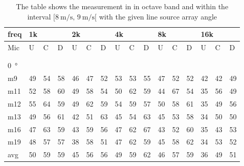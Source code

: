\begin{table}[H]
\centering
\caption{The table shows the measurement in in octave band and within the interval $[\SI{8}{\meter\per\second},\, \SI{9}{\meter\per\second}[ $ with the given line source array angle}
\begin{tabular}{l|l|l|l|l|l|l|l|l|l|l|l|l|lll}
freq & \multicolumn{3}{l|}{1k} & \multicolumn{3}{l|}{2k} & \multicolumn{3}{l|}{4k} & \multicolumn{3}{l|}{8k} & \multicolumn{3}{l}{16k}                                \\ \hline
Mic  & U      & C      & D     & U      & C      & D     & U      & C      & D     & U      & C      & D     & \multicolumn{1}{l|}{U}  & \multicolumn{1}{l|}{C}  & D  \\ \hline
 & \multicolumn{3}{l|}{} & \multicolumn{3}{l|}{} & \multicolumn{3}{l|}{} & \multicolumn{3}{l|}{} & \multicolumn{3}{l}{}                                \\ 
 \multicolumn{16}{l}{ } \\   
\SI{0}{\degree}   & \multicolumn{3}{l|}{} & \multicolumn{3}{l|}{} & \multicolumn{3}{l|}{} & \multicolumn{3}{l|}{} & \multicolumn{3}{l}{}   \\  \hline
m9   & 49     & 54     & 58    & 46     & 47     & 52    & 53     & 53     & 55    & 47     & 52     & 52    & \multicolumn{1}{l|}{42} & \multicolumn{1}{l|}{42} & 49 \\
m11  & 52     & 58     & 60    & 49     & 58     & 54    & 50     & 62     & 59    & 44     & 67     & 54    & \multicolumn{1}{l|}{35} & \multicolumn{1}{l|}{56} & 49 \\
m12  & 55     & 64     & 59    & 49     & 62     & 59    & 54     & 59     & 57    & 50     & 58     & 61    & \multicolumn{1}{l|}{35} & \multicolumn{1}{l|}{49} & 56 \\
m13  & 49     & 56     & 61    & 42     & 51     & 63    & 45     & 54     & 63    & 45     & 53     & 58    & \multicolumn{1}{l|}{34} & \multicolumn{1}{l|}{50} & 50 \\
m16  & 47     & 63     & 59    & 43     & 59     & 56    & 47     & 62     & 67    & 43     & 52     & 60    & \multicolumn{1}{l|}{35} & \multicolumn{1}{l|}{43} & 53 \\
m19  & 48     & 57     & 57    & 38     & 58     & 51    & 47     & 62     & 59    & 45     & 58     & 62    & \multicolumn{1}{l|}{34} & \multicolumn{1}{l|}{53} & 52 \\ \hline
avg  &  50    &  59    & 59    &  45     &  56    &  56   & 49     & 59     & 62    & 46     & 57     & 59    & \multicolumn{1}{l|}{36}   & \multicolumn{1}{l|}{49}   & 51 \\ \hline  

\end{tabular}
\end{table}
